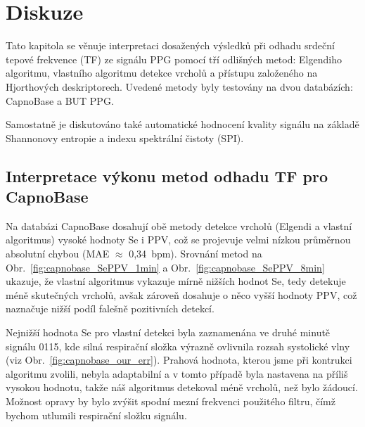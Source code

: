 \chapter{Diskuze} %
\label{ch:diskuze}

Tato kapitola se věnuje interpretaci dosažených výsledků při odhadu srdeční tepové frekvence (\acs{TF}) ze signálu \acs{PPG} pomocí tří odlišných metod: Elgendiho algoritmu, vlastního algoritmu detekce vrcholů a přístupu založeného na Hjorthových deskriptorech.
Uvedené metody byly testovány na dvou databázích: CapnoBase a BUT PPG.

Samostatně je diskutováno také automatické hodnocení kvality signálu na základě Shannonovy entropie a indexu spektrální čistoty (\acs{SPI}).

\section[Interpretace výkonu metod odhadu TF pro CapnoBase]{Interpretace výkonu metod odhadu TF pro\\CapnoBase}
Na databázi CapnoBase dosahují obě metody detekce vrcholů (Elgendi a vlastní algoritmus) vysoké hodnoty \acs{Se} i \acs{PPV}, což se projevuje velmi nízkou průměrnou absolutní chybou (\acs{MAE} $\approx$ 0,34~\acs{bpm}).
Srovnání metod na Obr.~\ref{fig:capnobase_SePPV_1min} a Obr.~\ref{fig:capnobase_SePPV_8min} ukazuje, že vlastní algoritmus vykazuje mírně nižších hodnot \acs{Se}, tedy detekuje méně skutečných vrcholů, avšak zároveň dosahuje o něco vyšší hodnoty \acs{PPV}, což naznačuje nižší podíl falešně pozitivních detekcí.

Nejnižší hodnota \acs{Se} pro vlastní detekci byla zaznamenána ve druhé minutě signálu 0115, kde silná respirační složka výrazně ovlivnila rozsah systolické vlny (viz Obr.~\ref{fig:capnobase_our_err}).
Prahová hodnota, kterou jsme při kontrukci algoritmu zvolili, nebyla adaptabilní a v tomto případě byla nastavena na příliš vysokou hodnotu, takže náš algoritmus detekoval méně vrcholů, než bylo žádoucí.
Možnost opravy by bylo zvýšit spodní mezní frekvenci použitého filtru, čímž bychom utlumili respirační složku signálu.

